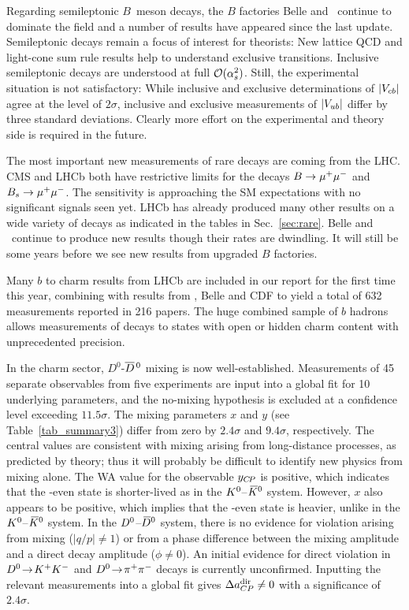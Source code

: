 Regarding semileptonic $B$~meson decays, the $B$ factories Belle
and \babar\ continue to dominate the field and a number of results
have appeared since the last update. Semileptonic decays remain a
focus of interest for theorists: New lattice QCD and light-cone sum
rule results help to understand exclusive transitions. Inclusive
semileptonic decays are understood at full ${\cal
O}(\alpha^2_s)$. Still, the experimental situation is not satisfactory:
While inclusive and exclusive determinations of $|V_{cb}|$ agree at the
level of $2\sigma$, inclusive and exclusive measurements of $|V_{ub}|$
differ by three standard deviations. Clearly more effort on the
experimental and theory side is required in the future.

The most important new measurements of rare decays are coming from the
LHC.  CMS and LHCb both have restrictive limits for the decays
$B\to\mu^+\mu^-$ and $B_s\to\mu^+\mu^-$.  The sensitivity is approaching the SM
expectations with no significant signals seen yet.  LHCb has already
produced many other results on a wide variety of decays as indicated in 
the tables in Sec.~\ref{sec:rare}.  Belle and \babar\ continue to
produce new results though their rates are dwindling.  It will still
be some years before we see new results from upgraded $B$ factories.

Many $b$ to charm results from LHCb are included in our report for the  
first time this year, combining with
results from \babar, Belle and CDF to yield a total of 632  
measurements reported in 216 papers.
The huge combined sample of $b$ hadrons allows measurements of decays  
to states with open or hidden charm
content with unprecedented precision.

In the charm sector, $D^0$-$\overline{D}{}^{\,0}$ mixing is now well-established.
Measurements of 45 separate observables from five experiments are input 
into a global fit for 10 underlying parameters, and the no-mixing 
hypothesis is excluded at a confidence level exceeding 
$11.5\sigma$. The mixing parameters
$x$ and $y$ (see Table~\ref{tab_summary3}) differ from zero by 
$2.4\sigma$ and $9.4\sigma$, respectively. The central values are 
consistent with mixing arising from long-distance processes, as
predicted by theory; thus it will probably be difficult to identify 
new physics from mixing alone. The WA value for the observable $y_{C\!P}$ 
is positive, which indicates that the \CP-even state is shorter-lived 
as in the $K^0$--$\kern 0.2em\overline{\kern -0.2em K}{}^0$ system. However, $x$ also appears to be 
positive, which implies that the \CP-even state is heavier, 
unlike in the $K^0$--$\kern 0.2em\overline{\kern -0.2em K}{}^0$ system. 
%
In the $D^0$--$\kern 0.2em\overline{\kern -0.2em D}{}^0$ system, 
there is no evidence for \CP violation arising from mixing ($|q/p|\neq 1$) or 
from a phase difference between the mixing amplitude and 
a direct decay amplitude ($\phi\neq 0$). An initial evidence for direct
\CP violation in $D^0\!\rightarrow\! K^+K^-$ and $D^0\!\rightarrow\! \pi^+\pi^-$ decays is currently unconfirmed. 
Inputting the relevant measurements into a global 
fit gives $\Delta a^{\rm dir}_{CP}\neq 0$ with a significance 
of $2.4\sigma$.

